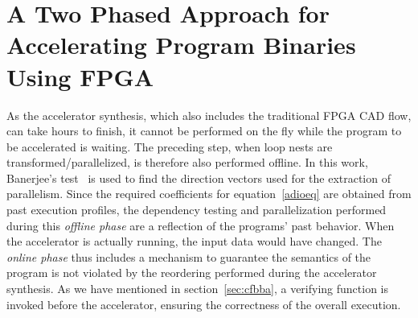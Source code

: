 \section{A Two Phased Approach for Accelerating Program Binaries Using FPGA}
\label{makingAcc}
As the accelerator synthesis, which also includes the traditional FPGA CAD flow,
can take hours to finish, it cannot be performed on the fly while the
program to be accelerated is waiting. The preceding step, when loop nests are transformed/parallelized, is therefore
also performed offline. 
In this work, Banerjee's test~\cite{Ban76} is used to find the direction vectors used for the extraction of parallelism. Since the required coefficients for equation~\ref{adioeq} are obtained from past execution profiles, the dependency testing and parallelization performed during this \textit{offline phase} are  a reflection of the programs' past behavior. When the accelerator is actually running, the input data would have changed. The \textit{online phase} thus includes a mechanism to guarantee the 
semantics of the program is not violated by the reordering performed during
the accelerator synthesis. As we have mentioned in section~\ref{sec:cfbba},
a verifying function is invoked before the accelerator, ensuring the correctness
of the overall execution. 



